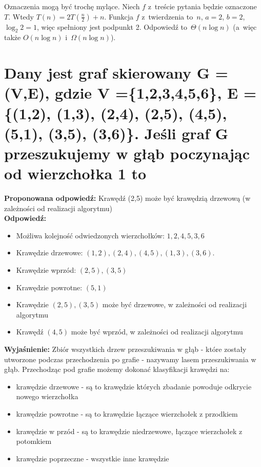 Oznaczenia mogą być trochę mylące. Niech $f$ z~treście pytania będzie oznaczone $T$. Wtedy $T(n) = 2T(\frac{n}{2}) + n$. Funkcja $f$ z~twierdzenia to~$n$, $a = 2$, $b = 2$, $\log_2 2 = 1 $, więc spełniony jest podpunkt 2. Odpowiedź to~\textbf{$\Theta(n\log n)$} (a~więc także $O(n\log n)$ i~$\Omega (n\log n)$).





\section{Dany jest graf skierowany G = (V,E), gdzie V =\{1,2,3,4,5,6\}, E = \{(1,2), (1,3), (2,4), (2,5), (4,5), (5,1), (3,5), (3,6)\}. Jeśli graf G przeszukujemy w głąb poczynając od wierzchołka 1 to}

\vspace{0.4cm}
\noindent \textbf{Proponowana odpowiedź:} Krawędź (2,5) może być krawędzią drzewową (w zależności od realizacji algorytmu) \\

\noindent \textbf{Odpowiedź:}  
\begin{itemize}
	\item Możliwa kolejność odwiedzonych wierzchołków: $1, 2, 4, 5, 3, 6$
	\item Krawędzie drzewowe: $(1, 2), (2, 4), (4, 5), (1, 3), (3, 6)$.
	\item Krawędzie wprzód: $(2, 5), (3, 5)$
	\item Krawędzie powrotne: $(5, 1)$
	\item Krawędzie $(2,5), (3, 5)$ może być drzewowe, w zależności od realizacji algorytmu 
	\item Krawędź $(4, 5)$ może być wprzód, w zależności od realizacji algorytmu 
\end{itemize}

\noindent \textbf{Wyjaśnienie:}
Zbiór wszystkich drzew przeszukiwania w głąb - które zostały utworzone podczas przechodzenia po grafie - nazywamy lasem przeszukiwania w głąb.
Przechodząc pod grafie możemy dokonać klasyfikacji krawędzi na:
\begin{itemize}
	\item krawędzie drzewowe - są to krawędzie których zbadanie powoduje odkrycie nowego wierzchołka
	\item krawędzie powrotne - są to krawędzie łączące wierzchołek z przodkiem
	\item krawędzie w przód - są to krawędzie niedrzewowe, łączące wierzchołek z potomkiem
	\item krawędzie poprzeczne - wszystkie inne krawędzie
\end{itemize}  



